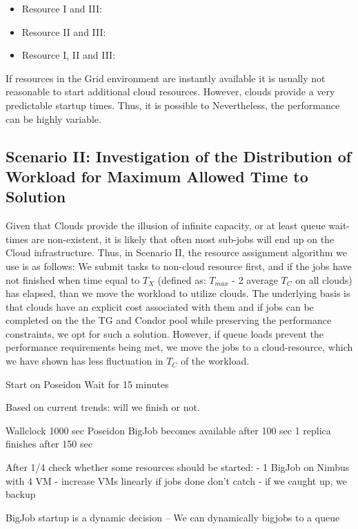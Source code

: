 \documentclass[conference,final]{IEEEtran}
\newcommand{\tmax}{$T_{max}$ }
\newcommand{\tc}{$T_{C}$ }
\begin{document}
\begin{itemize}
\item Resource I and III:
\item Resource II and III:
\item Resource I, II and III:
\end{itemize}


If resources in the Grid environment are instantly available it is usually not reasonable to start
additional cloud resources. However, clouds provide a very predictable startup times. Thus,
it is possible to  Nevertheless,
the performance can be highly variable.

\subsection{Scenario II: Investigation of the Distribution of Workload for Maximum Allowed
  Time to Solution} 

Given that Clouds provide the illusion of infinite capacity, or at
least queue wait-times are non-existent, it is likely that often most
sub-jobs will end up on the Cloud infrastructure.  Thus, in Scenario
II, the resource assignment algorithm we use is as follows: We submit
tasks to non-cloud resource first, and if the jobs have not finished
when time equal to $T_{X}$ (defined as: \tmax - 2 average \tc on all
clouds) has elapsed, than we move the workload to utilize clouds.  The
underlying basis is that clouds have an explicit cost associated with
them and if jobs can be completed on the the TG and Condor pool while
preserving the performance constraints, we opt for such a
solution. However, if queue loads prevent the performance requirements
being met, we move the jobs to a cloud-resource, which we have shown
has less fluctuation in \tc of the workload.

Start on Poseidon
Wait for 15 minutes

Based on current trends: will we finish or not.

Wallclock 1000 sec
Poseidon BigJob becomes available after 100 sec
1 replica finishes after 150 sec

After 1/4 check whether some resources should be started:
- 1 BigJob on Nimbus with 4 VM
- increase VMs linearly if jobs done don't catch
- if we caught up, we backup

BigJob startup is a dynamic decision -- We can dynamically bigjobs to a queue
\end{document}
